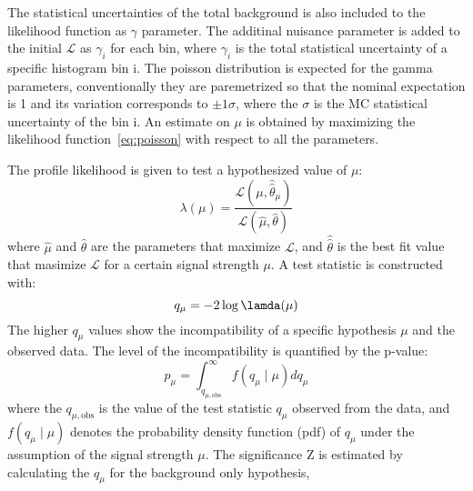 The statistical uncertainties of the total background is also included to the likelihood function as $\gamma$ parameter. 
The additinal nuisance parameter is added to the initial $\mathcal{L}$ as $\gamma_i$ for each bin, where $\gamma_i$ is the total statistical uncertainty of a specific histogram bin i. 
The poisson distribution is expected for the gamma parameters, conventionally they are paremetrized so that the nominal expectation is 1 and its variation corresponds to $\pm 1 \sigma$, where the $\sigma$ is the MC statistical uncertainty of the bin i.
An estimate on $\mu$ is obtained by maximizing the likelihood function~\ref{eq:poisson} with respect to all the parameters.  

The profile likelihood is given to test a hypothesized value of $\mu$:
\begin{equation}
\lambda(\mu) = \frac{\mathcal{L}\left(\mu, \hat{\hat{\theta}}_{\mu}\right)}{\mathcal{L}(\hat{\mu}, \hat{\theta})}
\end{equation}
where $\hat{\mu}$ and $\hat{\theta}$ are the parameters that maximize $\mathcal{L}$, and $\hat{\hat{\theta}}$ is the best fit value that masimize $\mathcal{L}$ for a certain signal strength $\mu$.
A test statistic is constructed with:
\begin{equation}
q_{\mu}= -2 \log \lamda (\mu)
\end{equation}
The higher $q_{\mu}$ values show the incompatibility of a specific hypothesis $\mu$ and the observed data.
The level of the incompatibility is quantified by the p-value:
\begin{equation}
p_{\mu}=\int_{q_{\mu, \mathrm{obs}}}^{\infty} f\left(q_{\mu} \mid \mu\right) d q_{\mu}
\end{equation}
where the $q_{\mu, \mathrm{obs}}$ is the value of the test statistic $q_{\mu}$ observed from the data, and $f\left(q_{\mu} \mid \mu\right)$ denotes the probability density function (pdf) of $q_{\mu}$ under the assumption of the signal strength $\mu$.
%
The significance Z is estimated by calculating the $q_{\mu}$ for the background only hypothesis,


